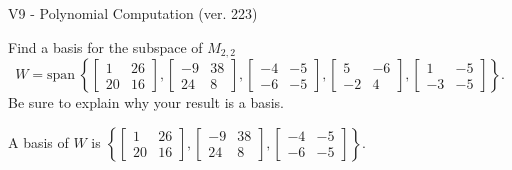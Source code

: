 \begin{exercise}
  \begin{exerciseTitle}V9 - Polynomial Computation (ver. 223)\end{exerciseTitle}
  \begin{exerciseStatement}
    Find a basis for the subspace of \(M_{2,2}\) 
\[W=\mathrm{span}\ \left\{\left[\begin{array}{cc}
1 & 26 \\
20 & 16
\end{array}\right] , \left[\begin{array}{cc}
-9 & 38 \\
24 & 8
\end{array}\right] , \left[\begin{array}{cc}
-4 & -5 \\
-6 & -5
\end{array}\right] , \left[\begin{array}{cc}
5 & -6 \\
-2 & 4
\end{array}\right] , \left[\begin{array}{cc}
1 & -5 \\
-3 & -5
\end{array}\right]\right\}.\]
 Be sure to explain why your result is a basis.


  \end{exerciseStatement}
  \begin{exerciseAnswer}
   A basis of \(W\) is  \(\left\{\left[\begin{array}{cc}
1 & 26 \\
20 & 16
\end{array}\right] , \left[\begin{array}{cc}
-9 & 38 \\
24 & 8
\end{array}\right] , \left[\begin{array}{cc}
-4 & -5 \\
-6 & -5
\end{array}\right]\right\}\).
  


  \end{exerciseAnswer}
\end{exercise}